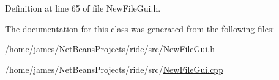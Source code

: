 Definition at line 65 of file New\-File\-Gui.\-h.



The documentation for this class was generated from the following files\-:\begin{DoxyCompactItemize}
\item 
/home/james/\-Net\-Beans\-Projects/ride/src/\hyperlink{_new_file_gui_8h}{New\-File\-Gui.\-h}\item 
/home/james/\-Net\-Beans\-Projects/ride/src/\hyperlink{_new_file_gui_8cpp}{New\-File\-Gui.\-cpp}\end{DoxyCompactItemize}
